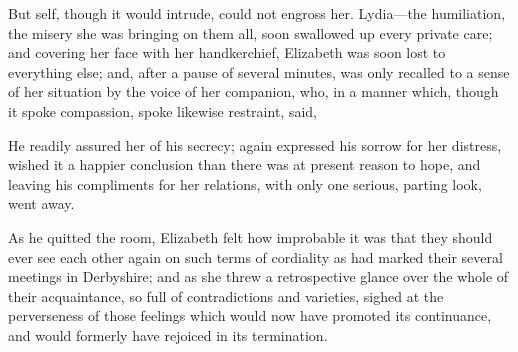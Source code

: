 But self, though it would intrude, could not engross her. Lydia---the humiliation, the misery she was bringing on them all, soon swallowed up every private care; and covering her face with her handkerchief, Elizabeth was soon lost to everything else; and, after a pause of several minutes, was only recalled to a sense of her situation by the voice of her companion, who, in a manner which, though it spoke compassion, spoke likewise restraint, said, 


He readily assured her of his secrecy; again expressed his sorrow for her distress, wished it a happier conclusion than there was at present reason to hope, and leaving his compliments for her relations, with only one serious, parting look, went away.

As he quitted the room, Elizabeth felt how improbable it was that they should ever see each other again on such terms of cordiality as had marked their several meetings in Derbyshire; and as she threw a retrospective glance over the whole of their acquaintance, so full of contradictions and varieties, sighed at the perverseness of those feelings which would now have promoted its continuance, and would formerly have rejoiced in its termination.

